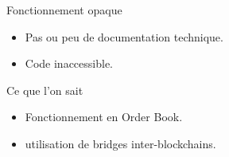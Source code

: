 \begin{frame}{Fonctionnement opaque}
    \begin{itemize}
        \item Pas ou peu de documentation technique.
        \item Code inaccessible.
    \end{itemize}
    \pause
    \begin{block}{Ce que l'on sait}
        \begin{itemize}
            \item Fonctionnement en Order Book.
            \item utilisation de bridges inter-blockchains.
        \end{itemize}
    \end{block}
\end{frame}
